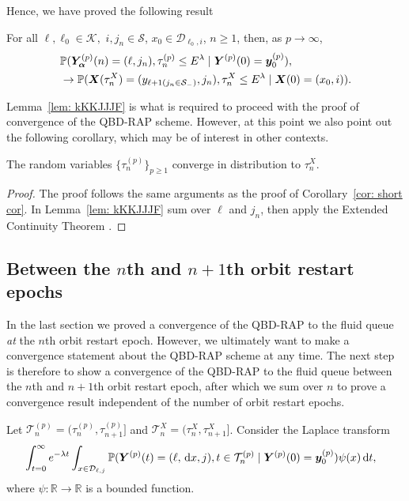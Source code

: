 Hence, we have proved the following result 
\begin{lem}\label{lem: kKKJJJF}
	For all \(\ell,\ell_0\in\mathcal K,\) \(i,j_n\in\mathcal S\), \(x_0\in\mathcal D_{\ell_0,i}\), \(n\geq 1\), then, as \(p\to\infty\),
	\begin{align}
		&\mathbb P(\bm{Y}_{\bm{\alpha}}^{(p)}(n) = (\ell,j_n), \tau_{n}^{(p)}\leq E^{\lambda}
		\mid \boldsymbol Y^{(p)}(0)=\boldsymbol y_0^{(p)}),\nonumber 
		\\&\to \mathbb P(\boldsymbol X(\tau_n^X) = (y_{\ell+1(j_{n}\in\mathcal S_-)}, 
		j_n), \tau_{n}^X\leq E^\lambda
		\mid \boldsymbol X(0)=(x_0, i)).
	\end{align}
\end{lem} 
Lemma~\ref{lem: kKKJJJF} is what is required to proceed with the proof of convergence of the QBD-RAP scheme. However, at this point we also point out the following corollary, which may be of interest in other contexts. 
\begin{cor}
	The random variables \(\{\tau_n^{(p)}\}_{p\geq 1}\) converge in distribution to \(\tau_n^X\). 
\end{cor}
\begin{proof}
	The proof follows the same arguments as the proof of Corollary~\ref{cor: short cor}. In Lemma~\ref{lem: kKKJJJF} sum over \(\ell\) and \(j_n\), then apply the Extended Continuity Theorem \cite[Chapter XIII, Theorem 2a]{feller1957}.
\end{proof}

\subsection{Between the \(n\)th and \(n+1\)th orbit restart epochs}\label{sec: between n and np1}
In the last section we proved a convergence of the QBD-RAP to the fluid queue \emph{at} the \(n\)th orbit restart epoch. However, we ultimately want to make a convergence statement about the QBD-RAP scheme at any time. The next step is therefore to show a convergence of the QBD-RAP to the fluid queue between the \(n\)th and \(n+1\)th orbit restart epoch, after which we sum over \(n\) to prove a convergence result independent of the number of orbit restart epochs. 

Let \(\mathcal T_n^{(p)} = (\tau_{n}^{(p)},\tau_{n+1}^{(p)}]\) and \(\mathcal T_n^X=(\tau_n^X,\tau_{n+1}^X]\). Consider the Laplace transform 
\begin{align}
	&\int_{t=0}^\infty e^{-\lambda t}\int_{x\in\mathcal{D}_{\ell,j}}\mathbb P({\boldsymbol Y}^{(p)}(t) = (\ell, \, \mathrm{d} x, j), t\in\mathcal T_n^{(p)} \mid 
	\boldsymbol Y^{(p)}(0)=\boldsymbol y_0^{(p)})\psi(x)\, \mathrm{d} t, \label{eqn: aaabbababbaa}
\end{align}
where \(\psi:\mathbb R\to \mathbb R\) is a bounded function. 

